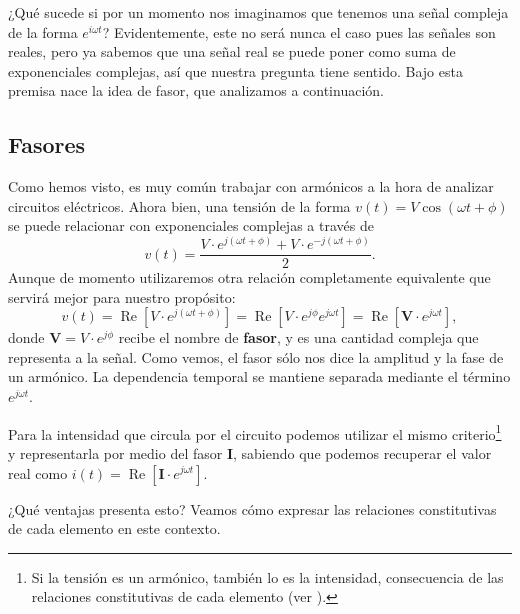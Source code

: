 ¿Qué sucede si por un momento nos imaginamos que tenemos una señal compleja de la forma $e^{i\omega t}$? Evidentemente, este no será nunca el caso pues las señales son reales, pero ya sabemos que una señal real se puede poner como suma de exponenciales complejas, así que nuestra pregunta tiene sentido. Bajo esta premisa nace la idea de fasor, que analizamos a continuación.

\subsection{Fasores}
Como hemos visto, es muy común trabajar con armónicos a la hora de analizar circuitos eléctricos. Ahora bien, una tensión de la forma $v(t) = V \cos(\omega t + \phi)$ se puede relacionar con exponenciales complejas a través de
\[
v(t) = \frac{V\cdot e^{j(\omega t + \phi)} + V\cdot e^{-j(\omega t + \phi)}}{2}.
\]
Aunque de momento utilizaremos otra relación completamente equivalente que servirá mejor para nuestro propósito:
\[
v(t) = \operatorname{Re} \left[V \cdot e^{j(\omega t + \phi)}\right] = \operatorname{Re} \left [V \cdot e^{j\phi} e^{j\omega t}\right] = \operatorname{Re} \left[\mathbf{V} \cdot  e^{j\omega t}\right],
\]
donde $\mathbf{V} = V \cdot e^{j\phi}$ recibe el nombre de \textbf{fasor}, y es una cantidad compleja que representa a la señal. Como vemos, el fasor sólo nos dice la amplitud y la fase de un armónico. La dependencia temporal se mantiene separada mediante el término $e^{j\omega t}$.

Para la intensidad que circula por el circuito podemos utilizar el mismo criterio\footnote{Si la tensión es un armónico, también lo es la intensidad, consecuencia de las relaciones constitutivas de cada elemento (ver \cite{FasorIntensidad}).} y representarla por medio del fasor $\mathbf{I}$, sabiendo que podemos recuperar el valor real como $i(t)=\operatorname{Re}\left[\mathbf{I}\cdot e^{j\omega t}\right]$.

¿Qué ventajas presenta esto? Veamos cómo expresar las relaciones constitutivas de cada elemento en este contexto.

